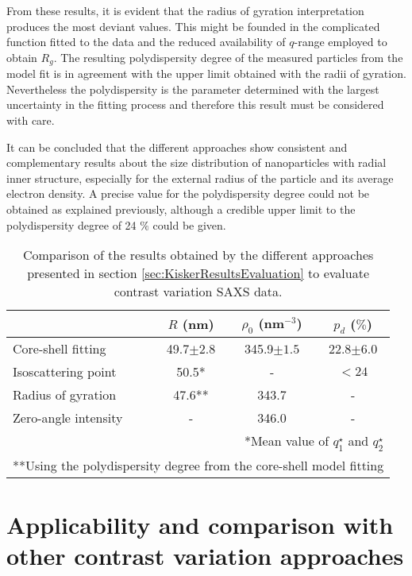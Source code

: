 From these results, it is evident that the radius of gyration interpretation produces the most deviant values. This might be founded in the complicated function fitted to the data and the reduced availability of $q$-range employed to obtain \( R_g \). The resulting polydispersity degree of the measured particles from the model fit is in agreement with the upper limit obtained with the radii of gyration. Nevertheless the polydispersity is the parameter determined with the largest uncertainty in the fitting process and therefore this result must be considered with care.

It can be concluded that the different approaches show consistent and complementary results about the size distribution of nanoparticles with radial inner structure, especially for the external radius of the particle and its average electron density. A precise value for the polydispersity degree could not be obtained as explained previously, although a credible upper limit to the polydispersity degree of 24 $\%$ could be given.

\begin{table*}
\caption[Comparison of the results obtained by different evaluation approaches to contrast variation SAXS data.]{Comparison of the results obtained by the different approaches presented in section \ref{sec:KiskerResultsEvaluation} to evaluate contrast variation SAXS data.}
\begin{tabular}{l|ccc}
 & \( R\) (nm)    & \(\rho_0\) (nm\(^{-3}\)) & \(p_d\) (\(\%\))\\
\hline
 Core-shell fitting &  49.7\(\pm 2.8\)   &     345.9\(\pm 1.5\)      & 22.8\(\pm 6.0\) \\
 Isoscattering point &  50.5* &     -          & $<24$  \\
 Radius of gyration &  47.6**      &     343.7      & -    \\
 Zero-angle intensity &  -    &     346.0      & -    \\ \hline
\multicolumn{4}{r}{*Mean value of \(q^{\star}_1\) and \(q^{\star}_2\)}\\  
\multicolumn{4}{r}{**Using the polydispersity degree from the core-shell model fitting}\\ 
\end{tabular}
\label{tab:comparison_results_Kisker}
\end{table*}

\section{Applicability and comparison with other contrast variation approaches}
\label{sec:applicability}

